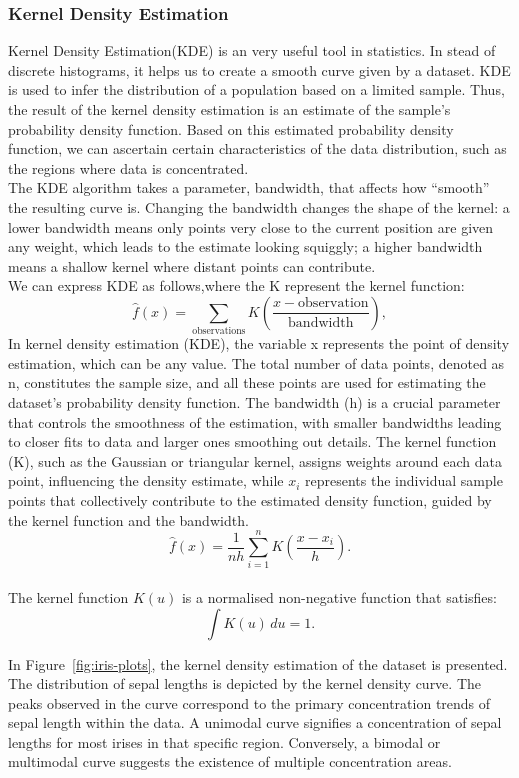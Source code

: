 \documentclass{article}\usepackage[]{graphicx}\usepackage[]{xcolor}
\begin{document}
\subsubsection{Kernel Density Estimation}

Kernel Density Estimation(KDE) is an very useful tool in statistics. In stead of discrete histograms, it helps us to create a smooth curve given by a dataset. KDE is used to infer the distribution of a population based on a limited sample. Thus, the result of the kernel density estimation is an estimate of the sample's probability density function. Based on this estimated probability density function, we can ascertain certain characteristics of the data distribution, such as the regions where data is concentrated.\\

\noindent
The KDE algorithm takes a parameter, bandwidth, that affects how “smooth” the resulting curve is. Changing the bandwidth changes the shape of the kernel: a lower bandwidth means only points very close to the current position are given any weight, which leads to the estimate looking squiggly; a higher bandwidth means a shallow kernel where distant points can contribute.\\

\noindent
We can express KDE as follows,where the K represent the kernel function:
$$\hat{f}(x) = \sum_{\text{observations}} K\left(\frac{x - \text{observation}}{\text{bandwidth}}\right),$$
In kernel density estimation (KDE), the variable x represents the point of density estimation, which can be any value. The total number of data points, denoted as n, constitutes the sample size, and all these points are used for estimating the dataset's probability density function. The bandwidth (h) is a crucial parameter that controls the smoothness of the estimation, with smaller bandwidths leading to closer fits to data and larger ones smoothing out details. The kernel function (K), such as the Gaussian or triangular kernel, assigns weights around each data point, influencing the density estimate, while $x_i$ represents the individual sample points that collectively contribute to the estimated density function, guided by the kernel function and the bandwidth\cite{wand1994kernel}.
$$\hat{f}(x) = \frac{1}{nh} \sum_{i=1}^{n} K\left(\frac{x - x_i}{h}\right).$$\\
The kernel function \( K(u) \) is a normalised non-negative function that satisfies:
\[ \int K(u) \, du = 1. \]

\noindent In Figure~\ref{fig:iris-plots}, the kernel density estimation of the dataset is presented. The distribution of sepal lengths is depicted by the kernel density curve. The peaks observed in the curve correspond to the primary concentration trends of sepal length within the data. A unimodal curve signifies a concentration of sepal lengths for most irises in that specific region. Conversely, a bimodal or multimodal curve suggests the existence of multiple concentration areas.
\end{document}
